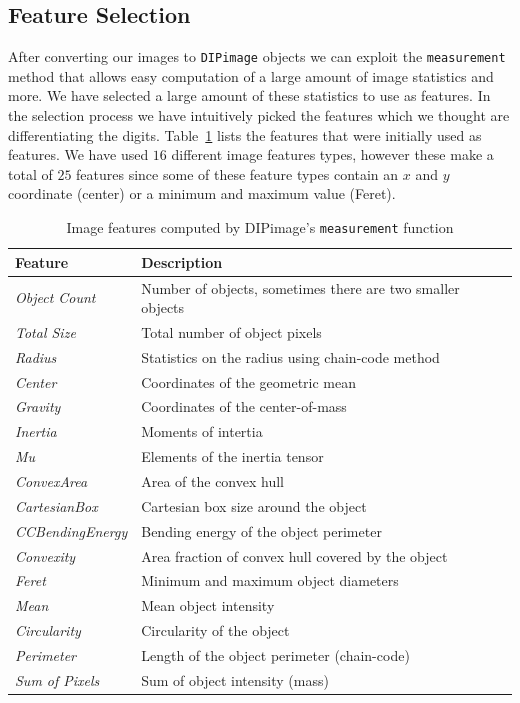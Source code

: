 \documentclass{article}
\begin{document}
\subsection{Feature Selection}

After converting our images to \texttt{DIPimage} objects we can exploit the \texttt{measurement} method that allows easy computation of a large amount of image statistics and more. We have selected a large amount of these statistics to use as features. In the selection process we have intuitively picked the features which we thought are differentiating the digits. Table~\ref{table:image-features} lists the features that were initially used as features. We have used $16$ different image features types, however these make a total of $25$ features since some of these feature types contain an $x$ and $y$ coordinate (center) or a minimum and maximum value (Feret).

\begin{table}[H]
    \small
	\centering
    \begin{tabular}{|l|l|}
    \hline
    \textbf{Feature} & \textbf{Description} \\
    \hline
    \emph{Object Count}     & Number of objects, sometimes there are two smaller objects \\
    \emph{Total Size}       & Total number of object pixels           \\
    \emph{Radius}       	& Statistics on the radius using chain-code method           \\
    \emph{Center}  		& Coordinates of the geometric mean \\
    \emph{Gravity} 		& Coordinates of the center-of-mass \\
    \emph{Inertia} 		& Moments of intertia \\
    \emph{Mu} 				& Elements of the inertia tensor \\
    \emph{ConvexArea} 		& Area of the convex hull \\
    \emph{CartesianBox} 	& Cartesian box size around the object \\
    \emph{CCBendingEnergy} & Bending energy of the object perimeter \\
    \emph{Convexity} 		& Area fraction of convex hull covered by the object \\
    \emph{Feret} 			& Minimum and maximum object diameters \\
    \emph{Mean} 			& Mean object intensity \\
    \emph{Circularity} 	& Circularity of the object \\
    \emph{Perimeter} 		& Length of the object perimeter (chain-code) \\
    \emph{Sum of Pixels} 	& Sum of object intensity (mass) \\
    \hline
    \end{tabular}
    \caption{Image features computed by DIPimage's \texttt{measurement} function \label{table:image-features}}
\end{table}
\end{document}
